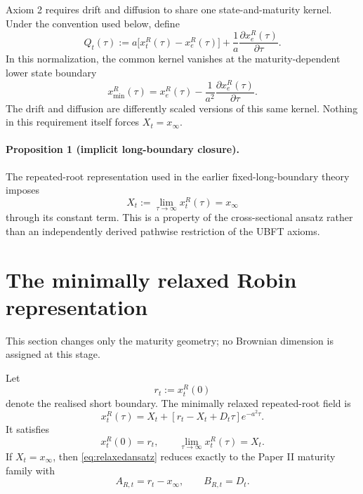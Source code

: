 \documentclass[11pt]{article}
\numberwithin{equation}{section}
\begin{document}
Axiom 2 requires drift and diffusion to share one state-and-maturity kernel. Under the convention used below, define
\begin{equation}
 Q_t(\tau)
 :=a\bigl[x_t^R(\tau)-x_e^R(\tau)\bigr]
 +\frac{1}{a}\frac{\partial x_e^R(\tau)}{\partial\tau}.
 \label{eq:Qdefinition}
\end{equation}
In this normalization, the common kernel vanishes at the maturity-dependent lower state boundary
\begin{equation}
 x_{\min}^R(\tau)
 =x_e^R(\tau)-\frac{1}{a^2}\frac{\partial x_e^R(\tau)}{\partial\tau}.
\end{equation}
The drift and diffusion are differently scaled versions of this same kernel. Nothing in this requirement itself forces $X_t=x_\infty$.

\paragraph{Proposition 1 (implicit long-boundary closure).}
The repeated-root representation used in the earlier fixed-long-boundary theory imposes
\begin{equation}
 X_t:=\lim_{\tau\to\infty}x_t^R(\tau)=x_\infty
\end{equation}
through its constant term. This is a property of the cross-sectional ansatz rather than an independently derived pathwise restriction of the UBFT axioms.

\section{The minimally relaxed Robin representation}

This section changes only the maturity geometry; no Brownian dimension is assigned at this stage.

Let
\begin{equation}
 r_t:=x_t^R(0)
\end{equation}
denote the realised short boundary. The minimally relaxed repeated-root field is
\begin{equation}
 \boxed{
 x_t^R(\tau)
 =X_t+[r_t-X_t+D_t\tau]e^{-a^2\tau}.
 }
 \label{eq:relaxedansatz}
\end{equation}
It satisfies
\begin{equation}
 x_t^R(0)=r_t,
 \qquad
 \lim_{\tau\to\infty}x_t^R(\tau)=X_t.
\end{equation}
If $X_t=x_\infty$, then \eqref{eq:relaxedansatz} reduces exactly to the Paper II maturity family with
\begin{equation}
 A_{R,t}=r_t-x_\infty,
 \qquad
 B_{R,t}=D_t.
\end{equation}
\end{document}
